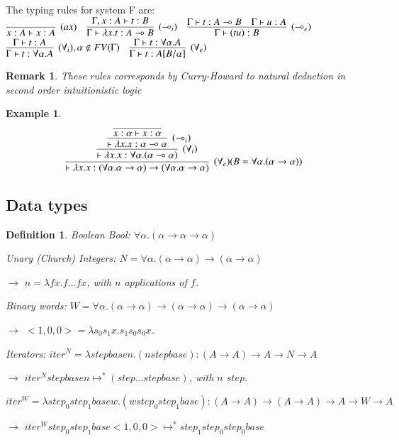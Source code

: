 \documentclass[a4paper,10pt]{article}
\newcommand{\impl}{\rightarrow}	%
\newcommand{\limpl}{\multimap}  %
\newtheorem{definition}{Definition}
\newtheorem{ex}{Example}
\newtheorem{rmk}{Remark}
\begin{document}
\par The typing rules for system F are:
$	\infer[(ax)]{x:A \vdash x:A}{} \quad
	\infer[(\limpl_i)]{\Gamma \vdash \lambda x.t : A \limpl B}{\Gamma, x:A \vdash t:B} \quad
	\infer[(\limpl_e)]{\Gamma \vdash (t u) : B}{\Gamma \vdash t : A \limpl B & \Gamma \vdash u : A }$\\
\vspace{0.2cm}
$	\infer[(\forall_i), \alpha \notin FV(\Gamma)]{\Gamma \vdash t:\forall \alpha.A}{\Gamma \vdash t:A} \quad
	\infer[(\forall_e)]{\Gamma \vdash t:A[B/\alpha]}{\Gamma \vdash t:\forall \alpha.A}
$

\begin{rmk}
These rules corresponds by Curry-Howard to natural deduction in second order intuitionistic logic
\end{rmk}

\begin{ex}
$$ \infer[(\forall_e) (B=\forall \alpha.(\alpha \impl \alpha))]{\vdash \lambda x. x: (\forall \alpha. \alpha \impl \alpha) \impl (\forall \alpha. \alpha \impl \alpha)}
	{
	\infer[(\forall_i)]{\vdash \lambda x.x : \forall \alpha.(\alpha \limpl \alpha)}
		{
		\infer[(\limpl_i)]{\vdash \lambda x.x : \alpha \limpl \alpha}
			{
				\infer{x:\alpha \vdash x:\alpha}{}
			}
		}
	}$$
\end{ex}



\subsection{Data types}

\begin{definition}
\item Boolean Bool: $\forall \alpha.(\alpha \impl \alpha \impl \alpha)$
\item Unary (Church) Integers: $N = \forall \alpha.(\alpha \impl \alpha) \impl (\alpha \impl \alpha)$
\item[$\rightarrow$] $\underbar{n} = \lambda f x. f\dots f x$, with $n$ applications of $f$.
\item Binary words: $W = \forall \alpha.(\alpha \impl \alpha) \impl (\alpha \impl \alpha) \impl (\alpha \impl \alpha)$
\item[$\rightarrow$] $<1,0,0> = \lambda s_0 s_1 x. s_1 s_0 s_0 x$.
\vspace{0.2cm}

\item Iterators: $iter^{N} = \lambda step base n. (n step base) : (A \impl A) \impl A \impl N \impl A$
\item[$\rightarrow$] $iter^{N} step base n \mapsto^{*} (step \dots step base)$, with $n$ $step$.
\item $iter^{W} = \lambda step_0 step_1 base w. (w step_0 step_1 base) : (A \impl A) \impl (A \impl A) \impl A \impl W \impl A$
\item[$\rightarrow$] $iter^{W} step_0 step_1 base <1,0,0> \mapsto^{*} step_1 step_0 step_0 base$
\end{definition}
\end{document}
